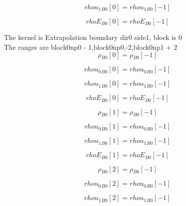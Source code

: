 \documentclass{article}
\begin{document}
\begin{dmath}{rhou_{1}{_{B0}}}[{0}] = {rhou_{1}{_{B0}}}[{-1}]\end{dmath}

\begin{dmath}{rhoE{_{B0}}}[{0}] = {rhoE{_{B0}}}[{-1}]\end{dmath}

\noindent The kernel is Extrapolation boundary dir0 side1, block is 0\\\noindent The ranges are block0np0 - 1,block0np0,-2,block0np1 + 2\\\begin{dmath}{\rho{_{B0}}}[{0}] = {\rho{_{B0}}}[{-1}]\end{dmath}

\begin{dmath}{rhou_{0}{_{B0}}}[{0}] = {rhou_{0}{_{B0}}}[{-1}]\end{dmath}

\begin{dmath}{rhou_{1}{_{B0}}}[{0}] = {rhou_{1}{_{B0}}}[{-1}]\end{dmath}

\begin{dmath}{rhoE{_{B0}}}[{0}] = {rhoE{_{B0}}}[{-1}]\end{dmath}

\begin{dmath}{\rho{_{B0}}}[{1}] = {\rho{_{B0}}}[{-1}]\end{dmath}

\begin{dmath}{rhou_{0}{_{B0}}}[{1}] = {rhou_{0}{_{B0}}}[{-1}]\end{dmath}

\begin{dmath}{rhou_{1}{_{B0}}}[{1}] = {rhou_{1}{_{B0}}}[{-1}]\end{dmath}

\begin{dmath}{rhoE{_{B0}}}[{1}] = {rhoE{_{B0}}}[{-1}]\end{dmath}

\begin{dmath}{\rho{_{B0}}}[{2}] = {\rho{_{B0}}}[{-1}]\end{dmath}

\begin{dmath}{rhou_{0}{_{B0}}}[{2}] = {rhou_{0}{_{B0}}}[{-1}]\end{dmath}

\begin{dmath}{rhou_{1}{_{B0}}}[{2}] = {rhou_{1}{_{B0}}}[{-1}]\end{dmath}
\end{document}
